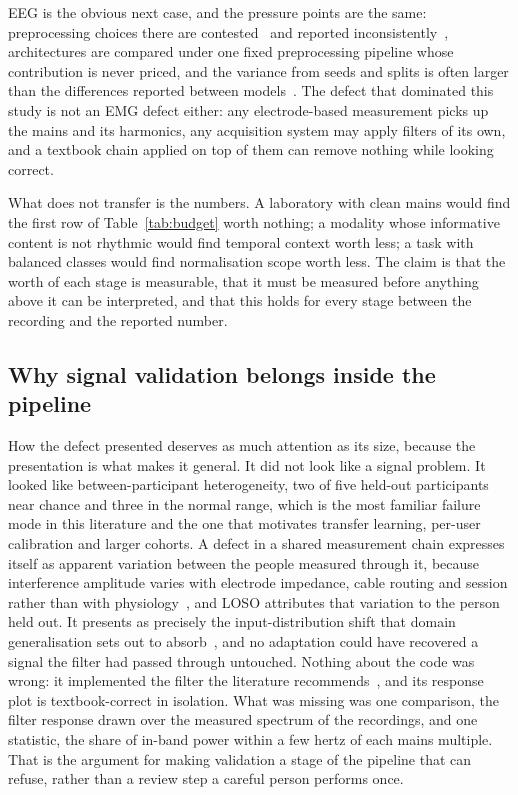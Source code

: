 \documentclass[pdflatex,sn-nature,iicol]{sn-jnl}
\begin{document}
EEG is the obvious next case, and the pressure points are the same: preprocessing choices there are contested~\cite{delorme2023eeg} and reported inconsistently~\cite{roy2019deep}, architectures are compared under one fixed preprocessing pipeline whose contribution is never priced, and the variance from seeds and splits is often larger than the differences reported between models~\cite{bouthillier2021accounting}. The defect that dominated this study is not an EMG defect either: any electrode-based measurement picks up the mains and its harmonics, any acquisition system may apply filters of its own, and a textbook chain applied on top of them can remove nothing while looking correct.

What does not transfer is the numbers. A laboratory with clean mains would find the first row of Table~\ref{tab:budget} worth nothing; a modality whose informative content is not rhythmic would find temporal context worth less; a task with balanced classes would find normalisation scope worth less. The claim is that the worth of each stage is measurable, that it must be measured before anything above it can be interpreted, and that this holds for every stage between the recording and the reported number.

\subsection{Why signal validation belongs inside the pipeline}

How the defect presented deserves as much attention as its size, because the presentation is what makes it general. It did not look like a signal problem. It looked like between-participant heterogeneity, two of five held-out participants near chance and three in the normal range, which is the most familiar failure mode in this literature and the one that motivates transfer learning, per-user calibration and larger cohorts. A defect in a shared measurement chain expresses itself as apparent variation between the people measured through it, because interference amplitude varies with electrode impedance, cable routing and session rather than with physiology~\cite{deluca2010filtering,besomi2019consensus}, and LOSO attributes that variation to the person held out. It presents as precisely the input-distribution shift that domain generalisation sets out to absorb~\cite{wang2022generalizing,kouw2021review}, and no adaptation could have recovered a signal the filter had passed through untouched. Nothing about the code was wrong: it implemented the filter the literature recommends~\cite{chowdhury2013surface,raez2006techniques}, and its response plot is textbook-correct in isolation. What was missing was one comparison, the filter response drawn over the measured spectrum of the recordings, and one statistic, the share of in-band power within a few hertz of each mains multiple. That is the argument for making validation a stage of the pipeline that can refuse, rather than a review step a careful person performs once.
\end{document}
